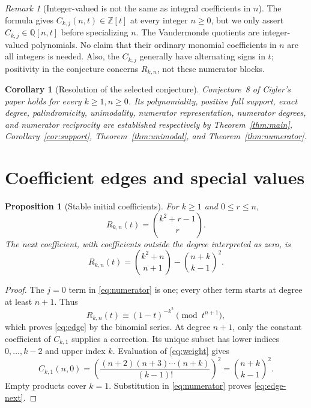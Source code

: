 \documentclass[11pt,a4paper]{article}
\newtheorem{proposition}[theorem]{Proposition}
\newtheorem{corollary}[theorem]{Corollary}
\theoremstyle{definition}
\theoremstyle{remark}
\newtheorem{remark}[theorem]{Remark}
\newcommand{\Q}{\mathbb Q}
\newcommand{\Z}{\mathbb Z}
\numberwithin{equation}{section}
\begin{document}
\begin{remark}[Integer-valued is not the same as integral coefficients in \(n\)]
The formula gives \(C_{k,j}(n,t)\in\Z[t]\) at every integer \(n\ge0\),
but we only assert \(C_{k,j}\in\Q[n,t]\) before specializing \(n\).
The Vandermonde quotients are integer-valued polynomials. No claim that
their ordinary monomial coefficients in \(n\) are all integers is needed.
Also, the \(C_{k,j}\) generally have alternating signs in \(t\); positivity
in the conjecture concerns \(R_{k,n}\), not these numerator blocks.
\end{remark}

\begin{corollary}[Resolution of the selected conjecture]
Conjecture~8 of Cigler's paper \cite{cigler} holds for every
\(k\ge1,n\ge0\). Its polynomiality, positive full support, exact degree,
palindromicity, unimodality, numerator representation, numerator degrees,
and numerator reciprocity are established respectively by
Theorem~\ref{thm:main}, Corollary~\ref{cor:support},
Theorem~\ref{thm:unimodal}, and Theorem~\ref{thm:numerator}.
\end{corollary}

\section{Coefficient edges and special values}
\label{sec:consequences}

\begin{proposition}[Stable initial coefficients]
\label{prop:edge}
For \(k\ge1\) and \(0\le r\le n\),
\begin{equation}
 [t^r]R_{k,n}(t)=\binom{k^2+r-1}{r}.
 \label{eq:edge}
\end{equation}
The next coefficient, with coefficients outside the degree interpreted as
zero, is
\begin{equation}
 [t^{n+1}]R_{k,n}(t)
 =\binom{k^2+n}{n+1}-\binom{n+k}{k-1}^{\!2}.
 \label{eq:edge-next}
\end{equation}
\end{proposition}
\begin{proof}
The \(j=0\) term in \eqref{eq:numerator} is one; every other term starts
at degree at least \(n+1\). Thus
\[
 R_{k,n}(t)\equiv(1-t)^{-k^2}\pmod{t^{n+1}},
\]
which proves \eqref{eq:edge} by the binomial series.
At degree \(n+1\), only the constant coefficient of \(C_{k,1}\) supplies
a correction. Its unique subset has lower indices \(0,\ldots,k-2\) and
upper index \(k\). Evaluation of \eqref{eq:weight} gives
\[
 C_{k,1}(n,0)
 =\left(\frac{(n+2)(n+3)\cdots(n+k)}{(k-1)!}\right)^2
 =\binom{n+k}{k-1}^{\!2}.
\]
Empty products cover \(k=1\). Substitution in \eqref{eq:numerator} proves
\eqref{eq:edge-next}.
\end{proof}
\end{document}
